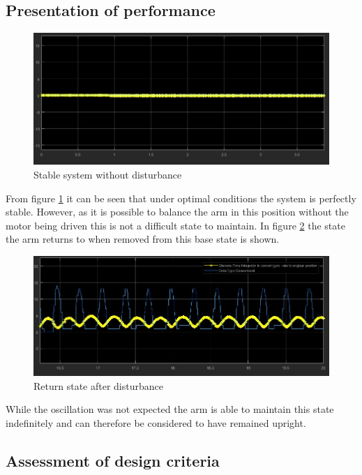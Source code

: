 \documentclass[11pt, a4paper,twocolumn]{article}
\begin{document}
        \subsection{Presentation of performance}\label{subsec:performance}

	\begin{figure}[h!]
	\begin{center}
	\includegraphics[width=\linewidth]{Undisturbed}
	\caption{Stable system without disturbance}
	\label{fig:4.1}
	\end{center}
	\end{figure}
From figure \ref{fig:4.1} it can be seen that under optimal conditions the system is perfectly stable. However, as it is possible to balance the arm in this position without the motor being driven this is not a difficult state to maintain. In figure \ref{fig:4.2} the state the arm returns to when removed from this base state is shown.
	\begin{figure}[h!]
	\begin{center}
	\includegraphics[width=\linewidth]{Ocilation}
	\caption{Return state after disturbance}
	\label{fig:4.2}
	\end{center}
	\end{figure}
While the oscillation was not expected the arm is able to maintain this state indefinitely and can therefore be considered to have remained upright.

        \subsection{Assessment of design criteria}\label{subsec:assessment}
\end{document}
